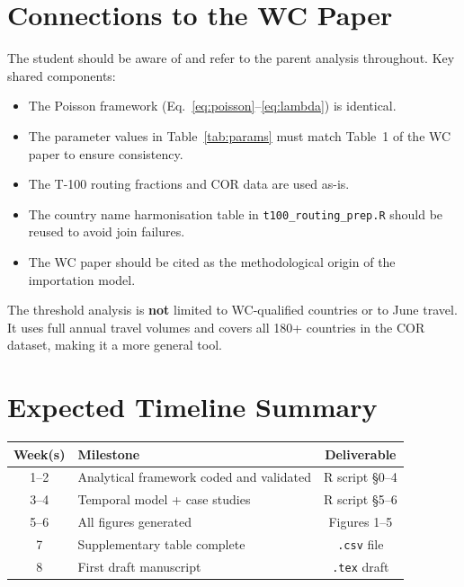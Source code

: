 \documentclass[12pt]{article}
\begin{document}
\section{Connections to the WC Paper}

The student should be aware of and refer to the parent analysis
throughout. Key shared components:

\begin{itemize}
  \item The Poisson framework (Eq.~\ref{eq:poisson}--\ref{eq:lambda})
        is identical.
  \item The parameter values in Table~\ref{tab:params} must match
        Table~1 of the WC paper to ensure consistency.
  \item The T-100 routing fractions and COR data are used as-is.
  \item The country name harmonisation table in
        \texttt{t100\_routing\_prep.R} should be reused to avoid
        join failures.
  \item The WC paper should be cited as the methodological origin
        of the importation model.
\end{itemize}

The threshold analysis is \textbf{not} limited to WC-qualified
countries or to June travel. It uses full annual travel volumes and
covers all 180+ countries in the COR dataset, making it a more
general tool.

\section{Expected Timeline Summary}

\begin{center}
\begin{tabular}{clc}
\toprule
\textbf{Week(s)} & \textbf{Milestone} & \textbf{Deliverable} \\
\midrule
1--2 & Analytical framework coded and validated & R script §0--4 \\
3--4 & Temporal model + case studies            & R script §5--6 \\
5--6 & All figures generated                    & Figures 1--5 \\
7    & Supplementary table complete             & \texttt{.csv} file \\
8    & First draft manuscript                   & \texttt{.tex} draft \\
\bottomrule
\end{tabular}
\end{center}
\end{document}

